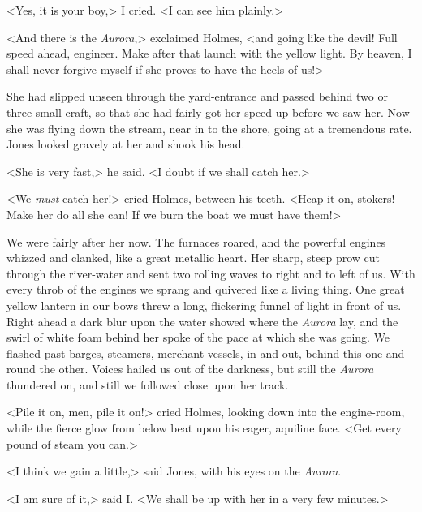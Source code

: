 <Yes, it is your boy,> I cried. <I can see him plainly.>

<And there is the \textit{Aurora},> exclaimed Holmes, <and going like the devil! Full speed ahead, engineer. Make after that launch with the yellow light. By heaven, I shall never forgive myself if she proves to have the heels of us!>

She had slipped unseen through the yard-entrance and passed behind two or three small craft, so that she had fairly got her speed up before we saw her. Now she was flying down the stream, near in to the shore, going at a tremendous rate. Jones looked gravely at her and shook his head.

<She is very fast,> he said. <I doubt if we shall catch her.>

<We \textit{must} catch her!> cried Holmes, between his teeth. <Heap it on, stokers! Make her do all she can! If we burn the boat we must have them!>

We were fairly after her now. The furnaces roared, and the powerful engines whizzed and clanked, like a great metallic heart. Her sharp, steep prow cut through the river-water and sent two rolling waves to right and to left of us. With every throb of the engines we sprang and quivered like a living thing. One great yellow lantern in our bows threw a long, flickering funnel of light in front of us. Right ahead a dark blur upon the water showed where the \textit{Aurora} lay, and the swirl of white foam behind her spoke of the pace at which she was going. We flashed past barges, steamers, merchant-vessels, in and out, behind this one and round the other. Voices hailed us out of the darkness, but still the \textit{Aurora} thundered on, and still we followed close upon her track.

<Pile it on, men, pile it on!> cried Holmes, looking down into the engine-room, while the fierce glow from below beat upon his eager, aquiline face. <Get every pound of steam you can.>

<I think we gain a little,> said Jones, with his eyes on the \textit{Aurora}.

<I am sure of it,> said I\@. <We shall be up with her in a very few minutes.>

